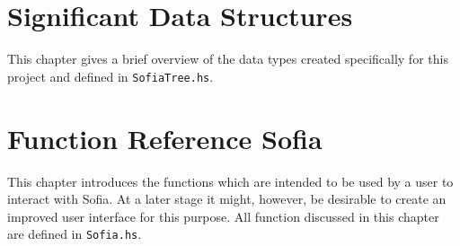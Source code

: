 \documentclass[notitlepage]{report}
\begin{document}
\chapter{Significant Data Structures}
This chapter gives a brief overview of the data types created specifically for
this project and defined in \texttt{SofiaTree.hs}.
\\


\chapter{Function Reference Sofia}
This chapter introduces the functions which are intended to be used by a user to
interact with Sofia. At a later stage it might, however, be desirable to create
an improved user interface for this purpose. All function discussed in this
chapter are defined in \texttt{Sofia.hs}.
\\


\pagebreak
\begingroup
{}
\setlength\bibitemsep{10pt}
\printbibliography\
\endgroup
\end{document}
